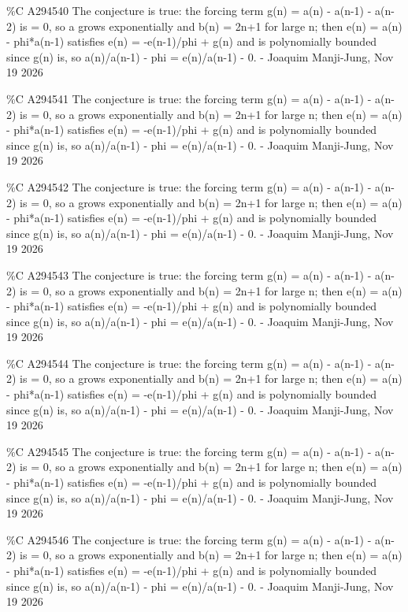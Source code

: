 {\%C A294540 The conjecture is true: the forcing term g(n) = a(n) - a(n-1) - a(n-2) is = 0, so a grows exponentially and b(n) = 2n+1 for large n; then e(n) = a(n) - phi*a(n-1) satisfies e(n) = -e(n-1)/phi + g(n) and is polynomially bounded since g(n) is, so a(n)/a(n-1) - phi = e(n)/a(n-1) - 0. - Joaquim Manji-Jung, Nov 19 2026\par
\%C A294541 The conjecture is true: the forcing term g(n) = a(n) - a(n-1) - a(n-2) is = 0, so a grows exponentially and b(n) = 2n+1 for large n; then e(n) = a(n) - phi*a(n-1) satisfies e(n) = -e(n-1)/phi + g(n) and is polynomially bounded since g(n) is, so a(n)/a(n-1) - phi = e(n)/a(n-1) - 0. - Joaquim Manji-Jung, Nov 19 2026\par
\%C A294542 The conjecture is true: the forcing term g(n) = a(n) - a(n-1) - a(n-2) is = 0, so a grows exponentially and b(n) = 2n+1 for large n; then e(n) = a(n) - phi*a(n-1) satisfies e(n) = -e(n-1)/phi + g(n) and is polynomially bounded since g(n) is, so a(n)/a(n-1) - phi = e(n)/a(n-1) - 0. - Joaquim Manji-Jung, Nov 19 2026\par
\%C A294543 The conjecture is true: the forcing term g(n) = a(n) - a(n-1) - a(n-2) is = 0, so a grows exponentially and b(n) = 2n+1 for large n; then e(n) = a(n) - phi*a(n-1) satisfies e(n) = -e(n-1)/phi + g(n) and is polynomially bounded since g(n) is, so a(n)/a(n-1) - phi = e(n)/a(n-1) - 0. - Joaquim Manji-Jung, Nov 19 2026\par
\%C A294544 The conjecture is true: the forcing term g(n) = a(n) - a(n-1) - a(n-2) is = 0, so a grows exponentially and b(n) = 2n+1 for large n; then e(n) = a(n) - phi*a(n-1) satisfies e(n) = -e(n-1)/phi + g(n) and is polynomially bounded since g(n) is, so a(n)/a(n-1) - phi = e(n)/a(n-1) - 0. - Joaquim Manji-Jung, Nov 19 2026\par
\%C A294545 The conjecture is true: the forcing term g(n) = a(n) - a(n-1) - a(n-2) is = 0, so a grows exponentially and b(n) = 2n+1 for large n; then e(n) = a(n) - phi*a(n-1) satisfies e(n) = -e(n-1)/phi + g(n) and is polynomially bounded since g(n) is, so a(n)/a(n-1) - phi = e(n)/a(n-1) - 0. - Joaquim Manji-Jung, Nov 19 2026\par
\%C A294546 The conjecture is true: the forcing term g(n) = a(n) - a(n-1) - a(n-2) is = 0, so a grows exponentially and b(n) = 2n+1 for large n; then e(n) = a(n) - phi*a(n-1) satisfies e(n) = -e(n-1)/phi + g(n) and is polynomially bounded since g(n) is, so a(n)/a(n-1) - phi = e(n)/a(n-1) - 0. - Joaquim Manji-Jung, Nov 19 2026\par
}
